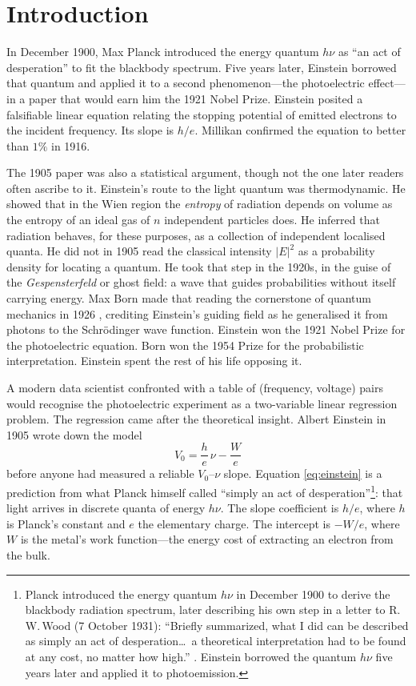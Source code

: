\documentclass[12pt]{article}
\begin{document}
\section{Introduction}

In December 1900, Max Planck introduced the energy quantum $h\nu$ as ``an act
of desperation'' to fit the blackbody spectrum.  Five years later, Einstein
borrowed that quantum and applied it to a second phenomenon---the photoelectric
effect---in a paper that would earn him the 1921 Nobel Prize.  Einstein posited
a falsifiable linear equation relating the stopping potential of emitted
electrons to the incident frequency.  Its slope is $h/e$.  Millikan confirmed
the equation to better than $1\%$ in 1916.

The 1905 paper was also a statistical argument, though not the one later
readers often ascribe to it.  Einstein's route to the light quantum was
thermodynamic.  He showed that in the Wien region the \emph{entropy} of
radiation depends on volume as the entropy of an ideal gas of $n$ independent
particles does.  He inferred that radiation behaves, for these purposes, as a
collection of independent localised quanta.  He did not in 1905 read the
classical intensity $|E|^2$ as a probability density for locating a quantum.
He took that step in the 1920s, in the guise of the \emph{Gespensterfeld} or
ghost field: a wave that guides probabilities without itself carrying energy.
Max Born made that reading the cornerstone of quantum mechanics in 1926
\citep{Born1926}, crediting Einstein's guiding field as he generalised it from
photons to the Schr\"odinger wave function.  Einstein won the 1921 Nobel Prize
for the photoelectric equation.  Born won the 1954 Prize for the probabilistic
interpretation.  Einstein spent the rest of his life opposing it.

A modern data scientist confronted with a table of (frequency, voltage) pairs
would recognise the photoelectric experiment as a two-variable linear regression
problem.  The regression came after the theoretical insight.  Albert
Einstein in 1905 wrote down the model
\begin{equation}\label{eq:einstein}
  V_0 = \frac{h}{e}\,\nu - \frac{W}{e}
\end{equation}
before anyone had measured a reliable $V_0$--$\nu$ slope.  Equation
\eqref{eq:einstein} is a prediction from what Planck himself called
``simply an act of desperation''\footnote{%
  Planck introduced the energy quantum $h\nu$ in December 1900 to derive
  the blackbody radiation spectrum, later describing his own step in a
  letter to R.\,W.\,Wood (7 October 1931): ``Briefly summarized, what I
  did can be described as simply an act of desperation\ldots\ a theoretical
  interpretation had to be found at any cost, no matter how high.''
  \citep{PlanckWood1931}.  Einstein borrowed the quantum $h\nu$ five
  years later and applied it to photoemission.}: that light
arrives in discrete quanta of energy $h\nu$.  The slope coefficient is
$h/e$, where $h$ is Planck's constant and $e$ the elementary charge.
The intercept is $-W/e$, where $W$ is the metal's work function---the energy
cost of extracting an electron from the bulk.
\end{document}
